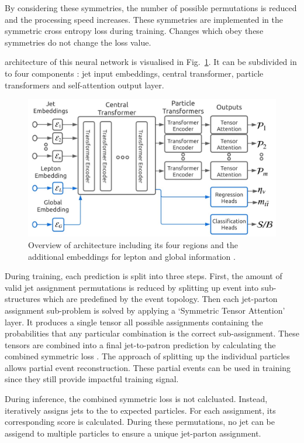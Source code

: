 \documentclass[bachelor,ngerman,english]{GAUBM}
\begin{document}
By considering these symmetries, the number of possible permutations is reduced and the processing speed increases. These symmetries are implemented in the symmetric cross entropy loss during training. Changes which obey these symmetries do not change the loss value.

\spanets architecture of this neural network is visualised in Fig.~\ref{fig:spanet}. It can be subdivided in to four components \cite{spanet_01}: jet input embeddings, central transformer, particle transformers and self-attention output layer.

\begin{figure}[t]
    \centering
    \includegraphics[width=.85\textwidth]{figures/methods/spanet_architecture_2.jpg}
    \caption{Overview of \spanets architecture including its four regions and the additional embeddings for lepton and global information \cite{spanet_02}.}
    \label{fig:spanet}
\end{figure}

During training, each prediction is split into three steps. First, the amount of valid jet assignment permutations is reduced by splitting up event into sub-structures which are predefined by the event topology. Then each jet-parton assignment sub-problem is solved by applying a `Symmetric Tensor Attention' \cite{spanet_01} layer. It produces a single tensor all possible assignments containing the probabilities that any particular combination is the correct sub-assignment. These tensors are combined into a final jet-to-patron prediction by calculating the combined symmetric loss \cite{spanet_01}. The approach of splitting up the individual particles allows partial event reconstruction. These partial events can be used in training since they still provide impactful training signal.

During inference, the combined symmetric loss is not calcluated. Instead, \spanet iteratively assigns jets to the to expected particles. For each assignment, its corresponding score is calculated. During these permutations, no jet can be assigend to multiple particles to ensure a unique jet-parton assignment.
\end{document}
